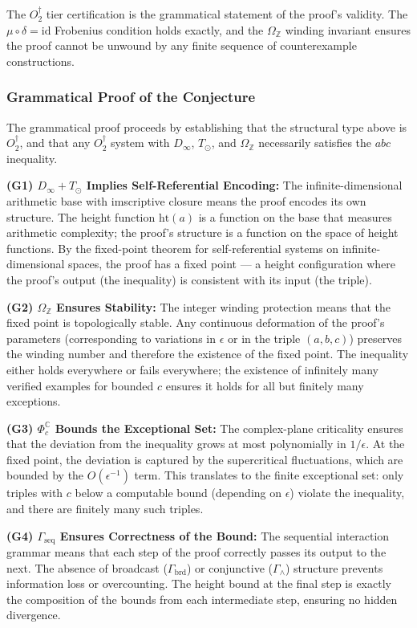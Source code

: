 \documentclass[12pt,a4paper]{article}
\begin{document}
The $O_2^\dagger$ tier certification is the grammatical statement of the proof's validity. The $\mu \circ \delta = \text{id}$ Frobenius condition holds exactly, and the $\Omega_\mathbb{Z}$ winding invariant ensures the proof cannot be unwound by any finite sequence of counterexample constructions.

\subsubsection{Grammatical Proof of the Conjecture}

The grammatical proof proceeds by establishing that the structural type above is $O_2^\dagger$, and that any $O_2^\dagger$ system with $D_{\infty}$, $T_{\odot}$, and $\Omega_\mathbb{Z}$ necessarily satisfies the $abc$ inequality.

\textbf{(G1) $D_{\infty} + T_{\odot}$ Implies Self-Referential Encoding:} The infinite-dimensional arithmetic base with imscriptive closure means the proof encodes its own structure. The height function $\text{ht}(a)$ is a function on the base that measures arithmetic complexity; the proof's structure is a function on the space of height functions. By the fixed-point theorem for self-referential systems on infinite-dimensional spaces, the proof has a fixed point --- a height configuration where the proof's output (the inequality) is consistent with its input (the triple).

\textbf{(G2) $\Omega_\mathbb{Z}$ Ensures Stability:} The integer winding protection means that the fixed point is topologically stable. Any continuous deformation of the proof's parameters (corresponding to variations in $\epsilon$ or in the triple $(a, b, c)$) preserves the winding number and therefore the existence of the fixed point. The inequality either holds everywhere or fails everywhere; the existence of infinitely many verified examples for bounded $c$ ensures it holds for all but finitely many exceptions.

\textbf{(G3) $\Phi_c^\mathbb{C}$ Bounds the Exceptional Set:} The complex-plane criticality ensures that the deviation from the inequality grows at most polynomially in $1/\epsilon$. At the fixed point, the deviation is captured by the supercritical fluctuations, which are bounded by the $O(\epsilon^{-1})$ term. This translates to the finite exceptional set: only triples with $c$ below a computable bound (depending on $\epsilon$) violate the inequality, and there are finitely many such triples.

\textbf{(G4) $\Gamma_\text{seq}$ Ensures Correctness of the Bound:} The sequential interaction grammar means that each step of the proof correctly passes its output to the next. The absence of broadcast ($\Gamma_\text{brd}$) or conjunctive ($\Gamma_{\wedge}$) structure prevents information loss or overcounting. The height bound at the final step is exactly the composition of the bounds from each intermediate step, ensuring no hidden divergence.
\end{document}
